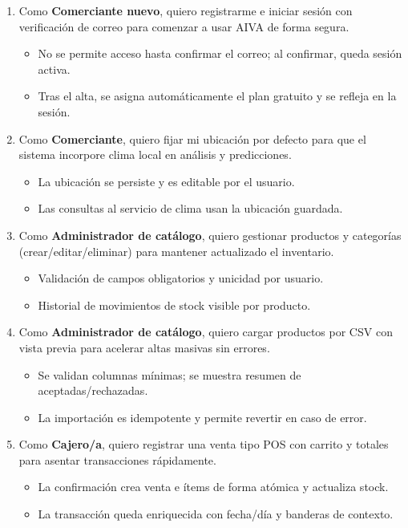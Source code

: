 \begin{enumerate}[label=HU-\arabic*., leftmargin=*, nosep]

\item Como \textbf{Comerciante nuevo}, quiero registrarme e iniciar sesión con verificación de correo para comenzar a usar AIVA de forma segura.
\begin{itemize}[nosep]
\item No se permite acceso hasta confirmar el correo; al confirmar, queda sesión activa.
\item Tras el alta, se asigna automáticamente el plan gratuito y se refleja en la sesión.
\end{itemize}

\item Como \textbf{Comerciante}, quiero fijar mi ubicación por defecto para que el sistema incorpore clima local en análisis y predicciones.
\begin{itemize}[nosep]
\item La ubicación se persiste y es editable por el usuario.
\item Las consultas al servicio de clima usan la ubicación guardada.
\end{itemize}

\item Como \textbf{Administrador de catálogo}, quiero gestionar productos y categorías (crear/editar/eliminar) para mantener actualizado el inventario.
\begin{itemize}[nosep]
\item Validación de campos obligatorios y unicidad por usuario.
\item Historial de movimientos de stock visible por producto.
\end{itemize}

\item Como \textbf{Administrador de catálogo}, quiero cargar productos por CSV con vista previa para acelerar altas masivas sin errores.
\begin{itemize}[nosep]
\item Se validan columnas mínimas; se muestra resumen de aceptadas/rechazadas.
\item La importación es idempotente y permite revertir en caso de error.
\end{itemize}

\item Como \textbf{Cajero/a}, quiero registrar una venta tipo POS con carrito y totales para asentar transacciones rápidamente.
\begin{itemize}[nosep]
\item La confirmación crea venta e ítems de forma atómica y actualiza stock.
\item La transacción queda enriquecida con fecha/día y banderas de contexto.
\end{itemize}


\end{enumerate}
